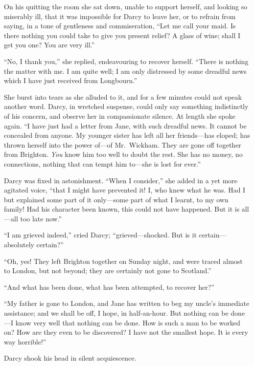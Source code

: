 On his quitting the room she sat down, unable to support
herself, and looking so miserably ill, that it was impossible
for Darcy to leave her, or to refrain from saying, in a tone
of gentleness and commiseration, ``Let me call your maid.  Is
there nothing you could take to give you present relief?  A
glass of wine; shall I get you one?  You are very ill.''

``No, I thank you,'' she replied, endeavouring to recover herself.
``There is nothing the matter with me.  I am quite well; I am
only distressed by some dreadful news which I have just
received from Longbourn.''

She burst into tears as she alluded to it, and for a few minutes
could not speak another word.  Darcy, in wretched suspense,
could only say something indistinctly of his concern, and
observe her in compassionate silence.  At length she spoke
again.  ``I have just had a letter from Jane, with such dreadful
news.  It cannot be concealed from anyone.  My younger sister
has left all her friends---has eloped; has thrown herself into
the power of---of Mr.\ Wickham.  They are gone off together from
Brighton.  \emph{You} know him too well to doubt the rest.  She has
no money, no connections, nothing that can tempt him to---she
is lost for ever.''

Darcy was fixed in astonishment.  ``When I consider,'' she added
in a yet more agitated voice, ``that I might have prevented it!
I, who knew what he was.  Had I but explained some part of
it only---some part of what I learnt, to my own family!  Had his
character been known, this could not have happened.  But it is
all---all too late now.''

``I am grieved indeed,'' cried Darcy; ``grieved---shocked.  But is
it certain---absolutely certain?''

``Oh, yes!  They left Brighton together on Sunday night, and
were traced almost to London, but not beyond; they are
certainly not gone to Scotland.''

``And what has been done, what has been attempted, to recover
her?''

``My father is gone to London, and Jane has written to beg my
uncle's immediate assistance; and we shall be off, I hope, in
half-an-hour.  But nothing can be done---I know very well that
nothing can be done.  How is such a man to be worked on?  How
are they even to be discovered?  I have not the smallest hope.
It is every way horrible!''

Darcy shook his head in silent acquiescence.


